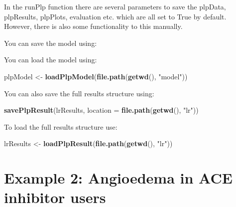 \documentclass[
]{article}
\newenvironment{Shaded}{\begin{snugshade}}{\end{snugshade}}
\newcommand{\DataTypeTok}[1]{\textcolor[rgb]{0.13,0.29,0.53}{#1}}
\newcommand{\KeywordTok}[1]{\textcolor[rgb]{0.13,0.29,0.53}{\textbf{#1}}}
\newcommand{\NormalTok}[1]{#1}
\newcommand{\OperatorTok}[1]{\textcolor[rgb]{0.81,0.36,0.00}{\textbf{#1}}}
\newcommand{\StringTok}[1]{\textcolor[rgb]{0.31,0.60,0.02}{#1}}
\begin{document}
In the runPlp function there are several parameters to save the plpData,
plpResults, plpPlots, evaluation etc. which are all set to True by
default. However, there is also some functionality to this manually.

You can save the model using:

\begin{Shaded}
\end{Shaded}

You can load the model using:

\begin{Shaded}
\begin{Highlighting}[]
\NormalTok{plpModel <-}\StringTok{ }\KeywordTok{loadPlpModel}\NormalTok{(}\KeywordTok{file.path}\NormalTok{(}\KeywordTok{getwd}\NormalTok{(), }\StringTok{"model"}\NormalTok{))}
\end{Highlighting}
\end{Shaded}

You can also save the full results structure using:

\begin{Shaded}
\begin{Highlighting}[]
\KeywordTok{savePlpResult}\NormalTok{(lrResults, }\DataTypeTok{location =} \KeywordTok{file.path}\NormalTok{(}\KeywordTok{getwd}\NormalTok{(), }\StringTok{"lr"}\NormalTok{))}
\end{Highlighting}
\end{Shaded}

To load the full results structure use:

\begin{Shaded}
\begin{Highlighting}[]
\NormalTok{lrResults <-}\StringTok{ }\KeywordTok{loadPlpResult}\NormalTok{(}\KeywordTok{file.path}\NormalTok{(}\KeywordTok{getwd}\NormalTok{(), }\StringTok{"lr"}\NormalTok{))}
\end{Highlighting}
\end{Shaded}

\newpage

\hypertarget{example2}{%
\section{Example 2: Angioedema in ACE inhibitor users}\label{example2}}
\end{document}
